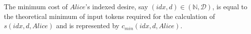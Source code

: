 \begin{definition}
  The minimum cost of $Alice$'s indexed desire, say $\left(idx, d\right) \in \left(\mathbb{N}, \mathcal{D}\right)$, is equal to
  the theoretical minimum of input tokens required for the calculation of $s\left(idx, d, Alice\right)$ and is represented by
  $c_{min}\left(idx, d, Alice\right)$.
\end{definition}
